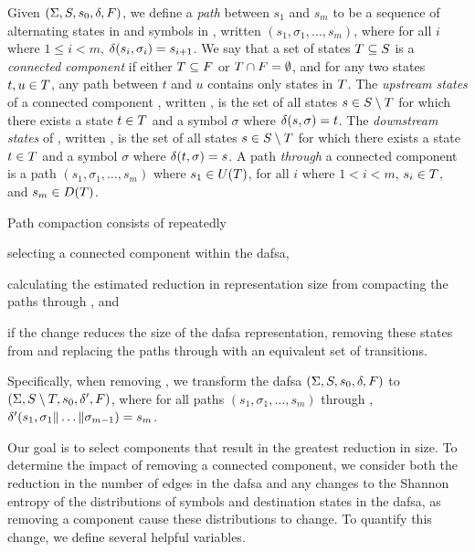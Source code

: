 Given  $(\Sigma, S, s_0, \delta, F)$,
we define a \emph{path} between $s_1$ and $s_m$ to be a sequence of alternating
states in \states and symbols in \symbols, written $(s_1, \sigma_1, \ldots,
s_m)$, where for all $i$ where $1 \le i < m$, $\delta(s_i, \sigma_i)
= s_{i+1}$.
We say that a set of states $T
\subseteq S$ is a \emph{connected component} if either $T
\subseteq F$ or $T \cap F = \emptyset$, and for
any two states $t, u \in T$, 
any path between $t$ and $u$ contains only states in $T$.
The \emph{upstream states} of a connected component \stateset, written
\upstream{\stateset}, is the set of all states $s \in S \setminus
T$ for which there exists a state $t \in T$ and a symbol
$\sigma$ where $\delta(s, \sigma) = t$. The \emph{downstream states} of
\stateset, written \downstream{\stateset}, is the set of all states $s \in
S \setminus T$ for which there exists a state $t \in T$
and a symbol $\sigma$ where $\delta(t, \sigma) = s$. A path \emph{through} a
connected component \stateset is a path $(s_1, \sigma_1, \ldots, s_m)$ where
$s_1 \in U(T)$, for all $i$ where $1 < i < m$, $s_i \in
T$, and $s_m \in D(T)$.

Path compaction consists of repeatedly
\begin{inparaenum}
\item selecting a connected component \stateset within the \ac{dafsa},
\item calculating the estimated reduction in representation size from compacting
  the paths through \stateset, and
\item if the change reduces the size of the \ac{dafsa} representation, removing
  these states from \states and replacing the paths through \stateset with an
  equivalent set of transitions.
\end{inparaenum}
Specifically, when removing \stateset, we transform the \ac{dafsa} $(\Sigma,
S, s_0, \delta, F)$ to $(\Sigma, S \setminus
T, s_0, \delta', F)$, where for all paths $(s_1,
\sigma_1, \ldots, s_m)$ through \stateset, $\delta'(s_1, \sigma_1 \| \dots \|
\sigma_{m-1}) = s_m$.

Our goal is to select components that result in the greatest reduction in size.
To determine the impact of removing a connected component, we 
consider both the reduction in the number of edges in the \ac{dafsa} and
any changes to the Shannon entropy of the distributions of symbols and
destination states in the \ac{dafsa}, as removing a component cause these
distributions to change. To quantify this change, we define several helpful
variables.

